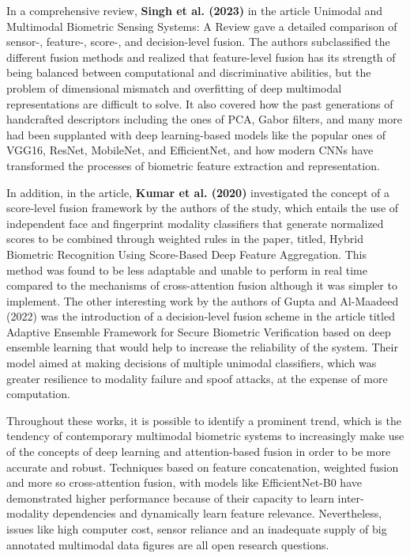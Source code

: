 \documentclass[12pt,a4paper]{report}
\begin{document}
In a comprehensive review, \textbf{Singh et al. (2023)} in the article Unimodal and Multimodal Biometric Sensing Systems: A Review gave a detailed comparison of sensor-, feature-, score-, and decision-level fusion. The authors subclassified the different fusion methods and realized that feature-level fusion has its strength of being balanced between computational and discriminative abilities, but the problem of dimensional mismatch and overfitting of deep multimodal representations are difficult to solve. It also covered how the past generations of handcrafted descriptors including the ones of PCA, Gabor filters, and many more had been supplanted with deep learning-based models like the popular ones of VGG16, ResNet, MobileNet, and EfficientNet, and how modern CNNs have transformed the processes of biometric feature extraction and representation.

In addition, in the article, \textbf{Kumar et al. (2020)} investigated the concept of a score-level fusion framework by the authors of the study, which entails the use of independent face and fingerprint modality classifiers that generate normalized scores to be combined through weighted rules in the paper, titled, Hybrid Biometric Recognition Using Score-Based Deep Feature Aggregation. This method was found to be less adaptable and unable to perform in real time compared to the mechanisms of cross-attention fusion although it was simpler to implement. The other interesting work by the authors of Gupta and Al-Maadeed (2022) was the introduction of a decision-level fusion scheme in the article titled Adaptive Ensemble Framework for Secure Biometric Verification based on deep ensemble learning that would help to increase the reliability of the system. Their model aimed at making decisions of multiple unimodal classifiers, which was greater resilience to modality failure and spoof attacks, at the expense of more computation.

Throughout these works, it is possible to identify a prominent trend, which is the tendency of contemporary multimodal biometric systems to increasingly make use of the concepts of deep learning and attention-based fusion in order to be more accurate and robust. Techniques based on feature concatenation, weighted fusion and more so cross-attention fusion, with models like EfficientNet-B0 have demonstrated higher performance because of their capacity to learn inter-modality dependencies and dynamically learn feature relevance. Nevertheless, issues like high computer cost, sensor reliance and an inadequate supply of big annotated multimodal data figures are all open research questions.
\end{document}
